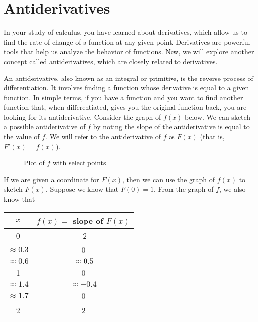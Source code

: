 \chapter{Antiderivatives}

In your study of calculus, you have learned about derivatives, which
allow us to find the rate of change of a function at any given
point. Derivatives are powerful tools that help us analyze the
behavior of functions. Now, we will explore another concept called
antiderivatives, which are closely related to derivatives.

An antiderivative, also known as an integral or primitive, is the
reverse process of differentiation. It involves finding a function
whose derivative is equal to a given function. In simple terms, if you
have a function and you want to find another function that, when
differentiated, gives you the original function back, you are looking
for its antiderivative. Consider the graph of $f(x)$ below. We can 
sketch a possible antiderivative of $f$ by noting the slope of the 
antiderivative is equal to the value of $f$. We will refer to the 
antiderivative of $f$ as $F(x)$ (that is, $F'(x) = f(x)$).

\begin{figure}[htpb]
\centering
    \caption{Plot of $f$ with select points}
    \label{fig:fplot}
\end{figure}

If we are given a coordinate for $F(x)$, then we can use the 
graph of $f(x)$ to sketch $F(x)$. Suppose we know that $F(0) = 1$. 
From the graph of $f$, we also know that\\
\begin{center}
\begin{tabular}{|c|c|}\hline
    $x$ & $f(x)=$  slope of $F(x)$ \\
    \hline
    0 & -2\\
    \hline
    $\approx0.3$ & 0\\
    \hline
    $\approx0.6$ & $\approx0.5$\\
    \hline
    1 & 0\\
    \hline
    $\approx1.4$ & $\approx-0.4$\\
    \hline
    $\approx1.7$ & 0\\
    \hline
    2 & 2\\
    \hline
\end{tabular}
\end{center}

